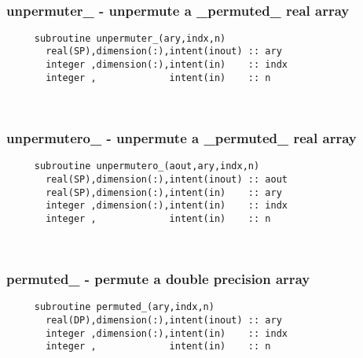  
\mbox{}\hrulefill\ 

  \subsubsection{unpermuter\_ - unpermute a \_permuted\_ real array}

\begin{verbatim} 
     subroutine unpermuter_(ary,indx,n)
       real(SP),dimension(:),intent(inout) :: ary
       integer ,dimension(:),intent(in)    :: indx
       integer ,             intent(in)    :: n
 \end{verbatim}%
 
 
\mbox{}\hrulefill\ 
 

  \subsubsection{unpermutero\_ - unpermute a \_permuted\_ real array}

\begin{verbatim} 
     subroutine unpermutero_(aout,ary,indx,n)
       real(SP),dimension(:),intent(inout) :: aout
       real(SP),dimension(:),intent(in)    :: ary
       integer ,dimension(:),intent(in)    :: indx
       integer ,             intent(in)    :: n
 \end{verbatim}%
 
 
\mbox{}\hrulefill\ 
 
  \subsubsection{permuted\_ - permute a double precision array}

\begin{verbatim} 
     subroutine permuted_(ary,indx,n)
       real(DP),dimension(:),intent(inout) :: ary
       integer ,dimension(:),intent(in)    :: indx
       integer ,             intent(in)    :: n
 \end{verbatim}%
 

